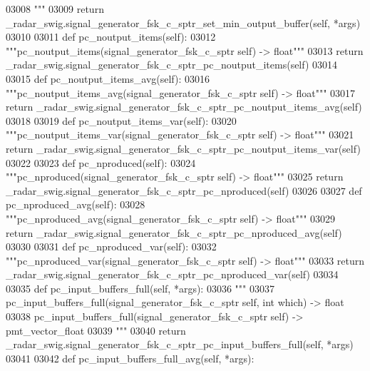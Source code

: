 \begin{DoxyCode}
{{{{{{{{{{{03008 \textcolor{stringliteral}{        """}
03009         \textcolor{keywordflow}{return} \_radar\_swig.signal\_generator\_fsk\_c\_sptr\_set\_min\_output\_buffer(self, *args)
03010 
03011     \textcolor{keyword}{def }pc_noutput_items(self):
03012         \textcolor{stringliteral}{"""pc\_noutput\_items(signal\_generator\_fsk\_c\_sptr self) -> float"""}
03013         \textcolor{keywordflow}{return} \_radar\_swig.signal\_generator\_fsk\_c\_sptr\_pc\_noutput\_items(self)
03014 
03015     \textcolor{keyword}{def }pc_noutput_items_avg(self):
03016         \textcolor{stringliteral}{"""pc\_noutput\_items\_avg(signal\_generator\_fsk\_c\_sptr self) -> float"""}
03017         \textcolor{keywordflow}{return} \_radar\_swig.signal\_generator\_fsk\_c\_sptr\_pc\_noutput\_items\_avg(self)
03018 
03019     \textcolor{keyword}{def }pc_noutput_items_var(self):
03020         \textcolor{stringliteral}{"""pc\_noutput\_items\_var(signal\_generator\_fsk\_c\_sptr self) -> float"""}
03021         \textcolor{keywordflow}{return} \_radar\_swig.signal\_generator\_fsk\_c\_sptr\_pc\_noutput\_items\_var(self)
03022 
03023     \textcolor{keyword}{def }pc_nproduced(self):
03024         \textcolor{stringliteral}{"""pc\_nproduced(signal\_generator\_fsk\_c\_sptr self) -> float"""}
03025         \textcolor{keywordflow}{return} \_radar\_swig.signal\_generator\_fsk\_c\_sptr\_pc\_nproduced(self)
03026 
03027     \textcolor{keyword}{def }pc_nproduced_avg(self):
03028         \textcolor{stringliteral}{"""pc\_nproduced\_avg(signal\_generator\_fsk\_c\_sptr self) -> float"""}
03029         \textcolor{keywordflow}{return} \_radar\_swig.signal\_generator\_fsk\_c\_sptr\_pc\_nproduced\_avg(self)
03030 
03031     \textcolor{keyword}{def }pc_nproduced_var(self):
03032         \textcolor{stringliteral}{"""pc\_nproduced\_var(signal\_generator\_fsk\_c\_sptr self) -> float"""}
03033         \textcolor{keywordflow}{return} \_radar\_swig.signal\_generator\_fsk\_c\_sptr\_pc\_nproduced\_var(self)
03034 
03035     \textcolor{keyword}{def }pc_input_buffers_full(self, *args):
03036         \textcolor{stringliteral}{"""}
03037 \textcolor{stringliteral}{        pc\_input\_buffers\_full(signal\_generator\_fsk\_c\_sptr self, int which) -> float}
03038 \textcolor{stringliteral}{        pc\_input\_buffers\_full(signal\_generator\_fsk\_c\_sptr self) -> pmt\_vector\_float}
03039 \textcolor{stringliteral}{        """}
03040         \textcolor{keywordflow}{return} \_radar\_swig.signal\_generator\_fsk\_c\_sptr\_pc\_input\_buffers\_full(self, *args)
03041 
03042     \textcolor{keyword}{def }pc_input_buffers_full_avg(self, *args):
}}}}}}}}}}}
\end{DoxyCode}
